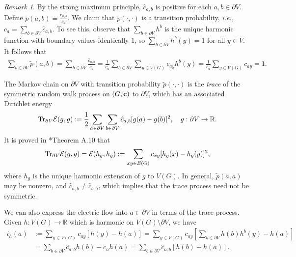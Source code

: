 \documentclass[11pt]{amsart}
\theoremstyle{plain}
\theoremstyle{definition}
\theoremstyle{remark}
\newtheorem{remark}[lemma]{Remark}
\begin{document}
\begin{remark}
\label{rem:trace}
By the strong maximum principle, $\hat{c}_{a,b}$ is positive for each $a,b\in \partial V$. Define $\widetilde{p}(a,b) = \frac{\hat{c}_{a,b}}{c_a}$. We claim that $\widetilde{p}(\cdot,\cdot)$ is a transition probability, \emph{i.e.,} $c_a = \sum_{b\in \partial V} \hat{c}_{a,b}$. To see this, observe that $\sum_{b\in \partial V} h^b$ is the unique harmonic function with boundary values identically $1$, so $\sum_{b\in \partial V} h^b(y) =1$ for all $y\in V$. It follows that 
\begin{align*}
\sum_{b\in \partial V} \widetilde{p}(a,b) = \sum_{b\in \partial V} \frac{\hat{c}_{a,b}}{c_a} = \frac{1}{c_a} \sum_{b\in\partial V} \sum_{y\in V(G)} c_{ay} h^b(y) = \frac{1}{c_a} \sum_{y\in V(G)} c_{ay}= 1.
\end{align*}

The Markov chain on $\partial V$ with transition probability $\widetilde{p}(\cdot,\cdot)$ is the \emph{trace} of the symmetric random walk process on $(G,{\bf c})$ to $\partial V$, which has an associated Dirichlet energy
\begin{align*}
{\rm Tr}_{\partial V} \mathcal{E}(g,g) := \frac{1}{2} \sum_{a\in \partial V} \sum_{b\in \partial V} \hat{c}_{a,b} [g(a)-g(b)]^2, \quad g: \partial V\to\mathbb{R}.
\end{align*}
It is proved in \cite{Ngasket}*{Theorem A.10} that 
\begin{align*}
{\rm Tr}_{\partial V} \mathcal{E}(g,g) = \mathcal{E}(h_g,h_g) := \sum_{xy\in E(G)} c_{xy} [h_g(x)-h_g(y)]^2,
\end{align*}
where $h_g$ is the unique harmonic extension of $g$ to $V(G)$. In general, $\tilde{p}(a,a)$ may be nonzero, and $\hat{c}_{a,b} \neq \hat{c}_{b,a}$, which implies that the trace process need not be symmetric.

We can also express the electric flow into $a\in \partial V$ in terms of the trace process. Given $h: V(G)\to \mathbb{R}$ which is harmonic on $V(G)\setminus \partial V$, we have
\begin{align*}
i_h(a) &:=\sum_{y\in V(G)} c_{ay}[h(y)-h(a)] = \sum_{y\in V(G)} c_{ay} \left[\sum_{b\in \partial V} h(b) h^b(y)- h(a)\right]\\
\nonumber &= \sum_{b\in \partial V} \hat{c}_{a,b} h(b) - c_a h(a) = \sum_{b\in \partial V} \hat{c}_{a,b} [h(b)-h(a)].
\end{align*} 
\end{remark}
\end{document}
